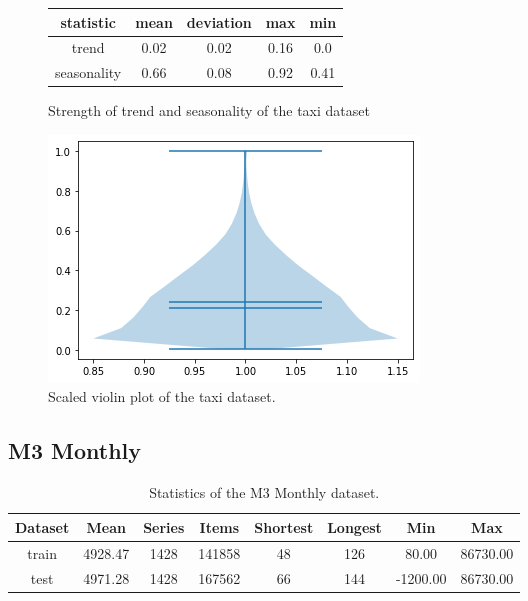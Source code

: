 \begin{figure}[htb]
    \centering
        \begin{center}
            \begin{tabular}{||c | c | c | c | c |} 
                \hline
                statistic & mean & deviation & max & min\\
                \hline
                trend & 0.02 & 0.02 & 0.16 & 0.0 \\
                \hline
                seasonality & 0.66 & 0.08 & 0.92 & 0.41 \\
                \hline
                \hline
            \end{tabular}
            \caption{Strength of trend and seasonality of the taxi dataset}
        \end{center}
    \endminipage\hfill
      \includegraphics[width=\linewidth]{4_designing/figures/taxi_30min_violin.png}
      \caption{Scaled violin plot of the taxi dataset.}
      \label{fig:taxi_30min_violin}
    \endminipage\hfill
\end{figure}

\clearpage
\subsection{M3 Monthly}

\begin{table}[htb]
    \begin{tabular}{||c | c c c c c c c ||} 
        \hline
        Dataset & Mean & Series & Items & Shortest & Longest & Min & Max \\ [0.5ex] 
        \hline\hline
        train & 4928.47 & 1428 & 141858 & 48 & 126 & 80.00 & 86730.00\\ 
        \hline
        test & 4971.28 & 1428 & 167562 & 66 & 144 & -1200.00 & 86730.00\\
        \hline
    \end{tabular}
    \caption{Statistics of the M3 Monthly dataset.}
\end{table}


